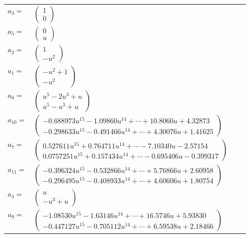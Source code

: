 \documentclass[1p]{elsarticle_modified}
\theoremstyle{definition}
\begin{document}
\begin{tabular}{m{7pt} m{180pt} m{7pt} m{180pt} }
\flushright $a_{3}=$&$\begin{pmatrix}1\\0\end{pmatrix}$ \\
\flushright $a_{5}=$&$\begin{pmatrix}0\\u\end{pmatrix}$ \\
\flushright $a_{2}=$&$\begin{pmatrix}1\\- u^2\end{pmatrix}$ \\
\flushright $a_{1}=$&$\begin{pmatrix}- u^2+1\\- u^2\end{pmatrix}$ \\
\flushright $a_{6}=$&$\begin{pmatrix}u^5-2 u^3+u\\u^5- u^3+u\end{pmatrix}$ \\
\flushright $a_{10}=$&$\begin{pmatrix}-0.688973 u^{15}-1.09860 u^{14}+\cdots+10.8060 u+4.32873\\-0.298633 u^{15}-0.491466 u^{14}+\cdots+4.30076 u+1.41625\end{pmatrix}$ \\
\flushright $a_{7}=$&$\begin{pmatrix}0.527611 u^{15}+0.764711 u^{14}+\cdots-7.10340 u-2.57154\\0.0757251 u^{15}+0.157434 u^{14}+\cdots-0.695406 u-0.399317\end{pmatrix}$ \\
\flushright $a_{11}=$&$\begin{pmatrix}-0.396324 u^{15}-0.532866 u^{14}+\cdots+5.76866 u+2.60958\\-0.296495 u^{15}-0.408933 u^{14}+\cdots+4.60606 u+1.80754\end{pmatrix}$ \\
\flushright $a_{4}=$&$\begin{pmatrix}u\\- u^3+u\end{pmatrix}$ \\
\flushright $a_{9}=$&$\begin{pmatrix}-1.08530 u^{15}-1.63146 u^{14}+\cdots+16.5746 u+5.93830\\-0.447127 u^{15}-0.705112 u^{14}+\cdots+6.59538 u+2.18466\end{pmatrix}$ \\

\end{tabular}
\end{document}
